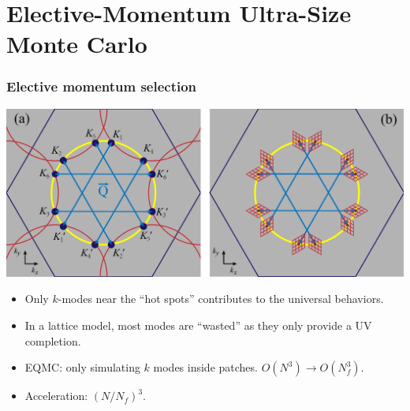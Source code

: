 \documentclass[xcolor=table, 10pt, aspectratio=43]{beamer}
\begin{document}
\section{Elective-Momentum Ultra-Size Monte Carlo}

\begin{frame}
  \frametitle{Elective momentum selection}
  \begin{center}
    \includegraphics[width=.8\textwidth]{../eqmc/kmeshtri}
  \end{center}
\begin{itemize}
  \item Only $k$-modes near the ``hot spots'' contributes to the universal behaviors.
  \item In a lattice model, most modes are ``wasted'' as they only provide a UV completion.
  \item EQMC: only simulating $k$ modes inside patches.
  $O(N^3)\rightarrow O(N_f^3)$.
  \item Acceleration: $(N/N_f)^3$.
\end{itemize}
\end{frame}
\end{document}
